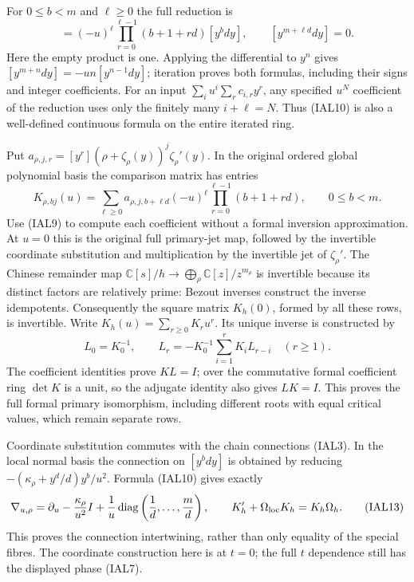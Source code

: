\documentclass[11pt,a4paper]{article}
\theoremstyle{definition}
\begin{document}
For $0\leq b<m$ and $\ell\geq0$ the full reduction is
\begin{equation}
 [y^{b+\ell d}dy]=(-u)^\ell
       \prod_{r=0}^{\ell-1}(b+1+rd)[y^bdy],\qquad
 [y^{m+\ell d}dy]=0.                                \tag{IAL10}
\end{equation}
Here the empty product is one.  Applying the differential to $y^n$
gives $[y^{m+n}dy]=-un[y^{n-1}dy]$; iteration proves both formulas,
including their signs and integer coefficients.  For an input
$\sum_i u^i\sum_r c_{i,r}y^r$, any specified $u^N$ coefficient of the
reduction uses only the finitely many $i+\ell=N$.  Thus (IAL10) is
also a well-defined continuous formula on the entire iterated ring.

Put
$a_{\rho,j,r}=[y^r](\rho+\zeta_\rho(y))^j\zeta_\rho'(y)$.
In the original ordered global polynomial basis the comparison matrix
has entries
\begin{equation}
 K_{\rho,bj}(u)=\sum_{\ell\geq0}
 a_{\rho,j,b+\ell d}(-u)^\ell
          \prod_{r=0}^{\ell-1}(b+1+rd),\qquad 0\leq b<m.
                                                        \tag{IAL11}
\end{equation}
Use (IAL9) to compute each coefficient without a formal inversion
approximation.  At $u=0$ this is the original full primary-jet map,
followed by the invertible coordinate substitution and multiplication
by the invertible jet of $\zeta_\rho'$.  The Chinese remainder map
$\mathbb C[s]/h\to\bigoplus_\rho\mathbb C[z]/z^{m_\rho}$ is invertible
because its distinct factors are relatively prime: Bezout inverses
construct the inverse idempotents.  Consequently the square matrix
$K_h(0)$, formed by all these rows, is invertible.  Write
$K_h(u)=\sum_{r\geq0}K_ru^r$.  Its unique inverse is constructed by
\begin{equation}
 L_0=K_0^{-1},\qquad
 L_r=-K_0^{-1}\sum_{i=1}^r K_iL_{r-i}\quad(r\geq1).
                                                        \tag{IAL12}
\end{equation}
The coefficient identities prove $KL=I$; over the commutative formal
coefficient ring $\det K$ is a unit, so the adjugate identity also gives
$LK=I$.  This proves the full formal primary isomorphism, including
different roots with equal critical values, which remain separate rows.

Coordinate substitution commutes with the chain connections (IAL3).
In the local normal basis the connection on $[y^bdy]$ is obtained by
reducing $-(\kappa_\rho+y^d/d)y^b/u^2$.  Formula (IAL10) gives exactly
\begin{equation}
 \nabla_{u,\rho}=\partial_u-\frac{\kappa_\rho}{u^2}I
 +\frac1u\operatorname{diag}\left(\frac1d,\ldots,\frac md\right),
 \qquad K_h'+\Omega_{\rm loc}K_h=K_h\Omega_h.          \tag{IAL13}
\end{equation}
This proves the connection intertwining, rather than only equality of
the special fibres.  The coordinate construction here is at $t=0$;
the full $t$ dependence still has the displayed phase (IAL7).
\end{document}
